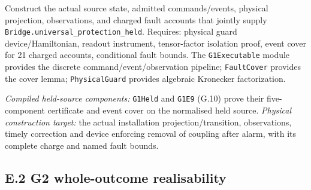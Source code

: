 \documentclass[
]{article}
\begin{document}
Construct the actual source state, admitted
c\allowbreak{}o\allowbreak{}m\allowbreak{}m\allowbreak{}a\allowbreak{}n\allowbreak{}d\allowbreak{}s\allowbreak{}/\allowbreak{}e\allowbreak{}v\allowbreak{}e\allowbreak{}n\allowbreak{}t\allowbreak{}s\allowbreak{},
physical projection, observations, and charged fault accounts that
jointly supply
\texttt{B\allowbreak{}r\allowbreak{}i\allowbreak{}d\allowbreak{}g\allowbreak{}e\allowbreak{}.\allowbreak{}u\allowbreak{}n\allowbreak{}i\allowbreak{}v\allowbreak{}e\allowbreak{}r\allowbreak{}s\allowbreak{}a\allowbreak{}l\allowbreak{}\_\allowbreak{}p\allowbreak{}r\allowbreak{}o\allowbreak{}t\allowbreak{}e\allowbreak{}c\allowbreak{}t\allowbreak{}i\allowbreak{}o\allowbreak{}n\allowbreak{}\_\allowbreak{}h\allowbreak{}e\allowbreak{}l\allowbreak{}d}.
Requires: physical guard
d\allowbreak{}e\allowbreak{}v\allowbreak{}i\allowbreak{}c\allowbreak{}e\allowbreak{}/\allowbreak{}H\allowbreak{}a\allowbreak{}m\allowbreak{}i\allowbreak{}l\allowbreak{}t\allowbreak{}o\allowbreak{}n\allowbreak{}i\allowbreak{}a\allowbreak{}n\allowbreak{},
readout instrument, tensor-factor isolation proof, event cover for 21
charged accounts, conditional fault bounds. The \texttt{G1Executable}
module provides the discrete
c\allowbreak{}o\allowbreak{}m\allowbreak{}m\allowbreak{}a\allowbreak{}n\allowbreak{}d\allowbreak{}/\allowbreak{}e\allowbreak{}v\allowbreak{}e\allowbreak{}n\allowbreak{}t\allowbreak{}/\allowbreak{}o\allowbreak{}b\allowbreak{}s\allowbreak{}e\allowbreak{}r\allowbreak{}v\allowbreak{}a\allowbreak{}t\allowbreak{}i\allowbreak{}o\allowbreak{}n
pipeline; \texttt{FaultCover} provides the cover lemma;
\texttt{PhysicalGuard} provides algebraic Kronecker factorization.

\emph{Compiled held-source components:} \texttt{G1Held} and
\texttt{G1E9} (G.10) prove their five-component certificate and event
cover on the normalised held source. \emph{Physical construction
target:} the actual installation
p\allowbreak{}r\allowbreak{}o\allowbreak{}j\allowbreak{}e\allowbreak{}c\allowbreak{}t\allowbreak{}i\allowbreak{}o\allowbreak{}n\allowbreak{}/\allowbreak{}t\allowbreak{}r\allowbreak{}a\allowbreak{}n\allowbreak{}s\allowbreak{}i\allowbreak{}t\allowbreak{}i\allowbreak{}o\allowbreak{}n\allowbreak{},
observations, timely correction and device enforcing removal of coupling
after alarm, with its complete charge and named fault bounds.

\subsection{E.2 G2 whole-outcome
realisability}\label{e.2-g2-whole-outcome-realisability}
\end{document}
